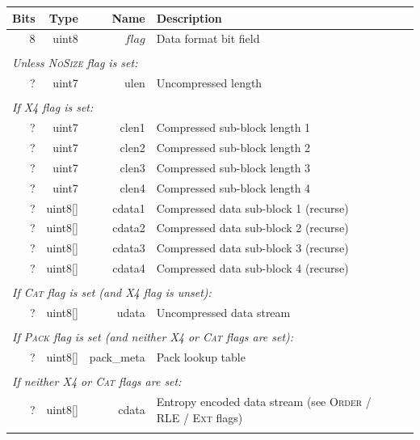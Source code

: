\documentclass[a4paper]{article}
\begin{document}
\begin{table}[h]
\centering
\begin{tabular}{|r|r|r|r|p{9cm}|l|}
\hline
\multicolumn{2}{|r|}{\textbf{Bits} } & \textbf{Type}  & \textbf{Name} & \multicolumn{2}{p{9cm}|}{\textbf{Description}} \\
\hline
\multicolumn{2}{|r|}{8} & uint8 & $flag$ & \multicolumn{2}{p{9cm}|}{Data format bit field}\\
\cline{1-6}

\multicolumn{6}{|l|}{}\\[-0.3em]
\multicolumn{6}{|l|}{\textit{Unless \textsc{NoSize} flag is set:} } \\
\cline{2-5}
& ? & uint7 & ulen & Uncompressed length & \\
\cline{2-5}

\multicolumn{6}{|l|}{}\\[-0.3em]
\multicolumn{6}{|l|}{\textit{If \textsc{X4} flag is set:} } \\
\cline{2-5}
& ? & uint7 & clen1 & Compressed sub-block length 1 & \\
& ? & uint7 & clen2 & Compressed sub-block length 2 & \\
& ? & uint7 & clen3 & Compressed sub-block length 3 & \\
& ? & uint7 & clen4 & Compressed sub-block length 4 & \\
& ? & uint8[] & cdata1 & Compressed data sub-block 1 (recurse) & \\
& ? & uint8[] & cdata2 & Compressed data sub-block 2 (recurse) & \\
& ? & uint8[] & cdata3 & Compressed data sub-block 3 (recurse) & \\
& ? & uint8[] & cdata4 & Compressed data sub-block 4 (recurse) & \\
\cline{2-5}

\multicolumn{6}{|l|}{}\\[-0.7em]
\multicolumn{6}{|l|}{\textit{If \textsc{Cat} flag is set (and \textsc{X4} flag is unset):} } \\
\cline{2-5}
& ? & uint8[] & udata & Uncompressed data stream & \\
\cline{2-5}

\multicolumn{6}{|l|}{}\\[-0.7em]
\multicolumn{6}{|l|}{\textit{If \textsc{Pack} flag is set (and neither \textsc{X4} or \textsc{Cat} flags are set):} } \\
\cline{2-5}
& ? & uint8[] & pack\_meta & Pack lookup table & \\
\cline{2-5}

\multicolumn{6}{|l|}{}\\[-0.7em]
\multicolumn{6}{|l|}{\textit{If neither \textsc{X4} or \textsc{Cat} flags are set:} } \\
\cline{2-5}
& ? & uint8[] & cdata & Entropy encoded data stream (see \textsc{Order} / \textsc{RLE} / \textsc{Ext} flags) & \\
\cline{2-5}
\multicolumn{6}{|l|}{}\\
\hline
\end{tabular}
\end{table}
\end{document}
